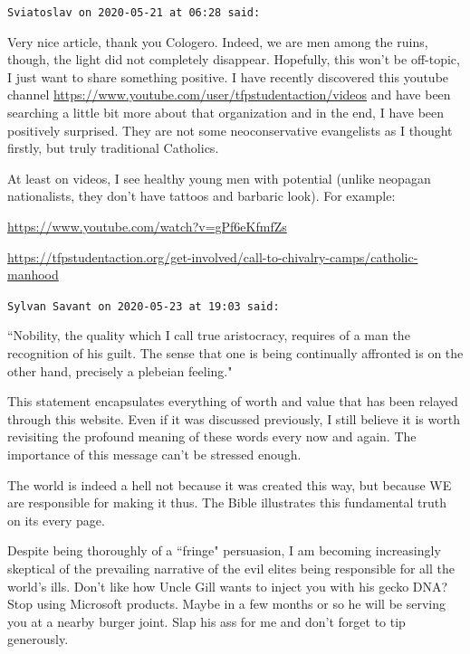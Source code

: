 \begin{footnotesize}\begin{sffamily}



\texttt{Sviatoslav on 2020-05-21 at 06:28 said: }

Very nice article, thank you Cologero. Indeed, we are men among the ruins, though, the light did not completely disappear. Hopefully, this won't be off-topic, I just want to share something positive. I have recently discovered this youtube channel \url{https://www.youtube.com/user/tfpstudentaction/videos} and have been searching a little bit more about that organization and in the end, I have been positively surprised. They are not some neoconservative evangelists as I thought firstly, but truly traditional Catholics. 

At least on videos, I see healthy young men with potential (unlike neopagan nationalists, they don't have tattoos and barbaric look). For example:

\url{https://www.youtube.com/watch?v=gPf6eKfmfZs}

\url{https://tfpstudentaction.org/get-involved/call-to-chivalry-camps/catholic-manhood}


\hfill

\texttt{Sylvan Savant on 2020-05-23 at 19:03 said: }

``Nobility, the quality which I call true aristocracy, requires of a man the recognition of his guilt. The sense that one is being continually affronted is on the other hand, precisely a plebeian feeling."

This statement encapsulates everything of worth and value that has been relayed through this website. Even if it was discussed previously, I still believe it is worth revisiting the profound meaning of these words every now and again. The importance of this message can't be stressed enough.

The world is indeed a hell not because it was created this way, but because WE are responsible for making it thus. The Bible illustrates this fundamental truth on its every page.

Despite being thoroughly of a ``fringe" persuasion, I am becoming increasingly skeptical of the prevailing narrative of the evil elites being responsible for all the world's ills. Don't like how Uncle Gill wants to inject you with his gecko DNA? Stop using Microsoft products. Maybe in a few months or so he will be serving you at a nearby burger joint. Slap his ass for me and don't forget to tip generously.


\end{sffamily}\end{footnotesize}
